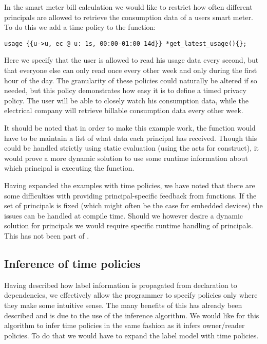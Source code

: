 In the smart meter bill calculation we would like to restrict how often different principals are allowed to retrieve the consumption data of a users smart meter.
To do this we add a time policy to the  function:

\begin{lstlisting}[style=dlmc]
  usage {{u->u, ec @ u: 1s, 00:00-01:00 14d}} *get_latest_usage(){};
\end{lstlisting}

Here we specify that the user is allowed to read his usage data every second, but that everyone else can only read once every other week and only during the first hour of the day.
The granularity of these policies could naturally be altered if so needed, but this policy demonstrates how easy it is to define a timed privacy policy.
The user will be able to closely watch his consumption data, while the electrical company will retrieve billable consumption data every other week.

It should be noted that in order to make this example work, the  function would have to be maintain a list of what data each principal has received.
Though this could be handled strictly using static evaluation (using the acts for construct), it would prove a more dynamic solution to use some runtime information about which principal is executing the function.

Having expanded the examples with time policies, we have noted that there are some difficulties with providing principal-specific feedback from functions.
If the set of principals is fixed (which might often be the case for embedded devices) the issues can be handled at compile time.
Should we however desire a dynamic solution for principals we would require specific runtime handling of principals.
This has not been part of \thelang{}.

\subsection{Inference of time policies}\label{time:inference}
Having described how label information is propagated from declaration to dependencies, we effectively allow the programmer to specify policies only where they make some intuitive sense.
The many benefits of this has already been described and is due to the use of the inference algorithm.
We would like for this algorithm to infer time policies in the same fashion as it infers owner/reader policies.
To do that we would have to expand the label model with time policies.

